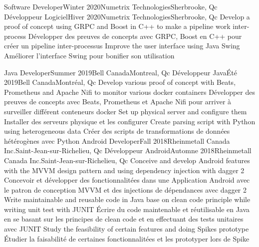     \resumeSubheadingEnFr
        {Software Developer}{Winter 2020}{Numetrix Technologies}{Sherbrooke, Qc}
        {Développeur Logiciel}{Hiver 2020}{Numetrix Technologies}{Sherbrooke, Qc}
            \resumeItemListStart
                \resumeItemEnFr
                    {Develop a proof of concept using GRPC and Boost in C++ to make a pipeline work inter-process}
                    {Développer des preuves de concepts avec GRPC, Boost en C++ pour créer un pipeline inter-processus}
                \resumeItemEnFr
                    {Improve the user interface using Java Swing}
                    {Améliorer l’interface Swing pour bonifier son utilisation}
            \resumeItemListEnd

    \resumeSubheadingEnFr
      {Java Developer}{Summer 2019}{Bell Canada}{Montreal, Qc}
      {Développeur Java}{Été 2019}{Bell Canada}{Montréal, Qc}
            \resumeItemListStart
                \resumeItemEnFr
                    {Develop various proof of concept with Beats, Prometheus and Apache Nifi to monitor various docker containers}
                    {Développer des preuves de concepts avec Beats, Prometheus et Apache Nifi pour arriver à surveiller différent conteneurs docker}
                \resumeItemEnFr
                    {Set up physical server and configure them}
                    {Installer des serveurs physique et les configurer}
                \resumeItemEnFr
                    {Create parsing script with Python using heterogeneous data}
                    {Créer des scripts de transformations de données hétérogènes avec Python}
            \resumeItemListEnd
    \resumeSubheadingEnFr
      {Android Developer}{Fall 2018}{Rheinmetall Canada Inc.}{Saint-Jean-sur-Richelieu, Qc}
      {Développeur Android}{Automne 2018}{Rheinmetall Canada Inc.}{Saint-Jean-sur-Richelieu, Qc}
            \resumeItemListStart
                \resumeItemEnFr
                    {Conceive and develop Android features with the MVVM design pattern and using dependency injection with dagger 2}
                    {Concevoir et développer des fonctionnalitées dans une Application Android avec le patron de conception MVVM et des injections de dépendances avec dagger 2}
                \resumeItemEnFr
                    {Write maintainable and reusable code in Java base on clean code principle while writing unit test with JUNIT}
                    {Écrire du code maintenable et réutilisable en Java en se basant sur les principes de clean code et en effectuant des tests unitaires avec JUNIT}
                \resumeItemEnFr
                    {Study the feasibility of certain features and doing Spikes prototype}
                    {Étudier la faisabilité de certaines fonctionnalitées et les prototyper lors de Spike}
            \resumeItemListEnd

